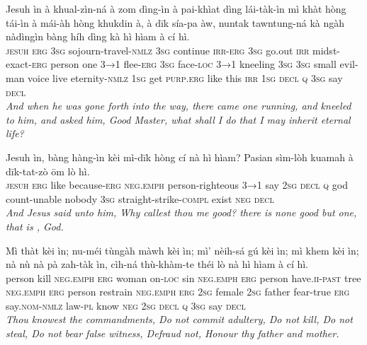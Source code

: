 \documentclass[11pt,a4paper]{article}
\begin{document}
\begin{exe}
\gll Jesuh ìn à khual-zìn-ná à zom dìng-ìn à pai-khìat dìng lái-tàk-ìn mì khàt hòng tái-ìn à mái-àh hòng khukdin à, à dīk sía-pa àw, nuntak tawntung-ná kà ngàh nàdìngìn bàng híh dìng kà hì hìam à cí hì. \\
     \textsc{jesuh} \textsc{erg} \textsc{3sg} sojourn-travel-\textsc{nmlz} \textsc{3sg} continue \textsc{irr}-\textsc{erg} \textsc{3sg} go.out \textsc{irr} midst-exact-\textsc{erg} person one \textsc{3→1} flee-\textsc{erg} \textsc{3sg} face-\textsc{loc} \textsc{3→1} kneeling \textsc{3sg} \textsc{3sg} small evil-man voice live eternity-\textsc{nmlz} \textsc{1sg} get \textsc{purp}.\textsc{erg} like this \textsc{irr} \textsc{1sg} \textsc{decl} \textsc{q} \textsc{3sg} say \textsc{decl} \\
\glt \textcolor{kjvcolor}{\textit{And when he was gone forth into the way, there came one running, and kneeled to him, and asked him, Good Master, what shall I do that I may inherit eternal life?}}

\gll Jesuh ìn, bàng hàng-ìn kèi mì-dīk hòng cí nà hì hìam? Pasian sìm-lòh kuamah à dīk-tat-zò ōm lò hì. \\
     \textsc{jesuh} \textsc{erg} like because-\textsc{erg} \textsc{neg}.\textsc{emph} person-righteous \textsc{3→1} say \textsc{2sg} \textsc{decl} \textsc{q} god count-unable nobody \textsc{3sg} straight-strike-\textsc{compl} exist \textsc{neg} \textsc{decl} \\
\glt \textcolor{kjvcolor}{\textit{And Jesus said unto him, Why callest thou me good? there is none good but one, that is , God.}}

\gll Mì thàt kèi ìn; nu-méi tùngàh màwh kèi ìn; mì' nèih-sá gú kèi ìn; mì khem kèi ìn; nà nù nà pà zah-tàk ìn, cìh-ná thù-khàm-te théi lò nà hì hìam à cí hì. \\
     person kill \textsc{neg}.\textsc{emph} \textsc{erg} woman on-\textsc{loc} sin \textsc{neg}.\textsc{emph} \textsc{erg} person have.\textsc{ii}-\textsc{past} tree \textsc{neg}.\textsc{emph} \textsc{erg} person restrain \textsc{neg}.\textsc{emph} \textsc{erg} \textsc{2sg} female \textsc{2sg} father fear-true \textsc{erg} say.\textsc{nom}-\textsc{nmlz} law-\textsc{pl} know \textsc{neg} \textsc{2sg} \textsc{decl} \textsc{q} \textsc{3sg} say \textsc{decl} \\
\glt \textcolor{kjvcolor}{\textit{Thou knowest the commandments, Do not commit adultery, Do not kill, Do not steal, Do not bear false witness, Defraud not, Honour thy father and mother.}}


\end{exe}
\end{document}
